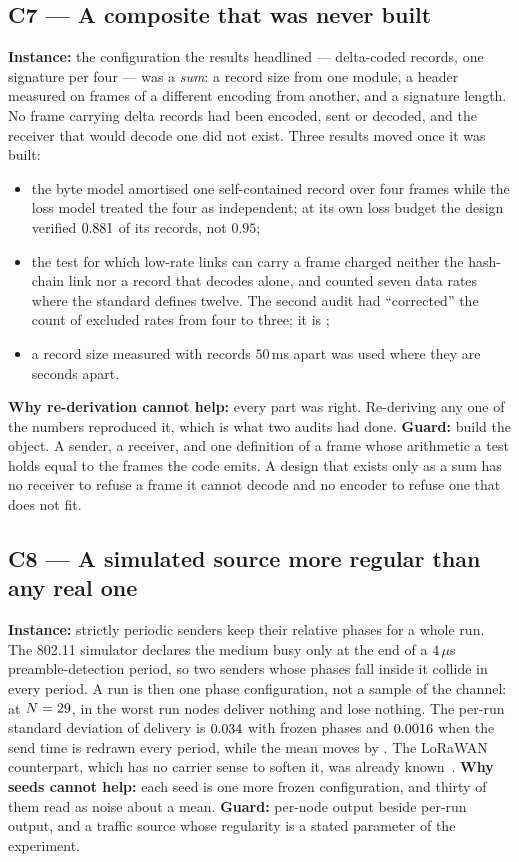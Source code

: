 \documentclass[conference]{IEEEtran}
\begin{document}
\subsection{C7 --- A composite that was never built}
\textbf{Instance:} the configuration the results headlined --- delta-coded records, one signature
per four --- was a \emph{sum}: a record size from one module, a header measured on frames of a
different encoding from another, and a signature length. No frame carrying delta records had been
encoded, sent or decoded, and the receiver that would decode one did not exist. Three results
moved once it was built:
\begin{itemize}\itemsep2pt
\item the byte model amortised one self-contained record over four frames while the loss model
treated the four as independent; at its own loss budget the design verified $0.881$ of its
records, not $0.95$;
\item the test for which low-rate links can carry a frame charged neither the hash-chain link nor
a record that decodes alone, and counted seven data rates where the standard defines twelve. The
second audit had ``corrected'' the count of excluded rates from four to three; it is \exclCount;
\item a record size measured with records $50$\,ms apart was used where they are seconds apart.
\end{itemize}
\textbf{Why re-derivation cannot help:} every part was right. Re-deriving any one of the numbers
reproduced it, which is what two audits had done.
\textbf{Guard:} build the object. A sender, a receiver, and one definition of a frame whose
arithmetic a test holds equal to the frames the code emits. A design that exists only as a sum has
no receiver to refuse a frame it cannot decode and no encoder to refuse one that does not fit.

\subsection{C8 --- A simulated source more regular than any real one}
\textbf{Instance:} strictly periodic senders keep their relative phases for a whole run. The
802.11 simulator declares the medium busy only at the end of a $4$\,$\mu$s preamble-detection
period, so two senders whose phases fall inside it collide in every period. A run is then one
phase configuration, not a sample of the channel: at $N = 29$, in the worst run
\phaseSilentNodes{} nodes deliver nothing and \phaseCleanNodes{} lose nothing. The per-run
standard deviation of delivery is $0.034$ with frozen phases and $0.0016$ when
the send time is redrawn every period, while the mean moves by \srcMeanDiff. The LoRaWAN counterpart, which has
no carrier sense to soften it, was already known~\cite{durand2025loramesh}.
\textbf{Why seeds cannot help:} each seed is one more frozen configuration, and thirty of them
read as noise about a mean.
\textbf{Guard:} per-node output beside per-run output, and a traffic source whose regularity is a
stated parameter of the experiment.
\end{document}
